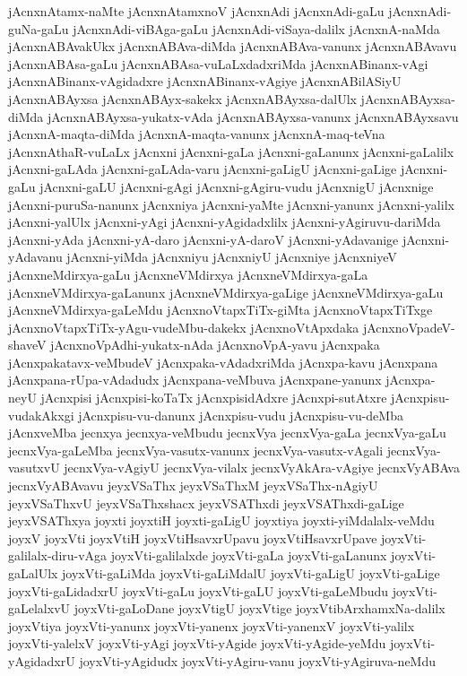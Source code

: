 {jAcnxnAtamx-naMte
jAcnxnAtamxnoV
jAcnxnAdi
jAcnxnAdi-gaLu
jAcnxnAdi-guNa-gaLu
jAcnxnAdi-viBAga-gaLu
jAcnxnAdi-viSaya-dalilx
jAcnxnA-naMda
jAcnxnABAvakUkx
jAcnxnABAva-diMda
jAcnxnABAva-vanunx
jAcnxnABAvavu
jAcnxnABAsa-gaLu
jAcnxnABAsa-vuLaLxdadxriMda
jAcnxnABinanx-vAgi
jAcnxnABinanx-vAgidadxre
jAcnxnABinanx-vAgiye
jAcnxnABilASiyU
jAcnxnABAyxsa
jAcnxnABAyx-sakekx
jAcnxnABAyxsa-dalUlx
jAcnxnABAyxsa-diMda
jAcnxnABAyxsa-yukatx-vAda
jAcnxnABAyxsa-vanunx
jAcnxnABAyxsavu
jAcnxnA-maqta-diMda
jAcnxnA-maqta-vanunx
jAcnxnA-maq-teVna
jAcnxnAthaR-vuLaLx
jAcnxni
jAcnxni-gaLa
jAcnxni-gaLanunx
jAcnxni-gaLalilx
jAcnxni-gaLAda
jAcnxni-gaLAda-varu
jAcnxni-gaLigU
jAcnxni-gaLige
jAcnxni-gaLu
jAcnxni-gaLU
jAcnxni-gAgi
jAcnxni-gAgiru-vudu
jAcnxnigU
jAcnxnige
jAcnxni-puruSa-nanunx
jAcnxniya
jAcnxni-yaMte
jAcnxni-yanunx
jAcnxni-yalilx
jAcnxni-yalUlx
jAcnxni-yAgi
jAcnxni-yAgidadxlilx
jAcnxni-yAgiruvu-dariMda
jAcnxni-yAda
jAcnxni-yA-daro
jAcnxni-yA-daroV
jAcnxni-yAdavanige
jAcnxni-yAdavanu
jAcnxni-yiMda
jAcnxniyu
jAcnxniyU
jAcnxniye
jAcnxniyeV
jAcnxneMdirxya-gaLu
jAcnxneVMdirxya
jAcnxneVMdirxya-gaLa
jAcnxneVMdirxya-gaLanunx
jAcnxneVMdirxya-gaLige
jAcnxneVMdirxya-gaLu
jAcnxneVMdirxya-gaLeMdu
jAcnxnoVtapxTiTx-giMta
jAcnxnoVtapxTiTxge
jAcnxnoVtapxTiTx-yAgu-vudeMbu-dakekx
jAcnxnoVtApxdaka
jAcnxnoVpadeV-shaveV
jAcnxnoVpAdhi-yukatx-nAda
jAcnxnoVpA-yavu
jAcnxpaka
jAcnxpakatavx-veMbudeV
jAcnxpaka-vAdadxriMda
jAcnxpa-kavu
jAcnxpana
jAcnxpana-rUpa-vAdadudx
jAcnxpana-veMbuva
jAcnxpane-yanunx
jAcnxpa-neyU
jAcnxpisi
jAcnxpisi-koTaTx
jAcnxpisidAdxre
jAcnxpi-sutAtxre
jAcnxpisu-vudakAkxgi
jAcnxpisu-vu-danunx
jAcnxpisu-vudu
jAcnxpisu-vu-deMba
jAcnxveMba
jecnxya
jecnxya-veMbudu
jecnxVya
jecnxVya-gaLa
jecnxVya-gaLu
jecnxVya-gaLeMba
jecnxVya-vasutx-vanunx
jecnxVya-vasutx-vAgali
jecnxVya-vasutxvU
jecnxVya-vAgiyU
jecnxVya-vilalx
jecnxVyAkAra-vAgiye
jecnxVyABAva
jecnxVyABAvavu
jeyxVSaThx
jeyxVSaThxM
jeyxVSaThx-nAgiyU
jeyxVSaThxvU
jeyxVSaThxshacx
jeyxVSAThxdi
jeyxVSAThxdi-gaLige
jeyxVSAThxya
joyxti
joyxtiH
joyxti-gaLigU
joyxtiya
joyxti-yiMdalalx-veMdu
joyxV
joyxVti
joyxVtiH
joyxVtiHsavxrUpavu
joyxVtiHsavxrUpave
joyxVti-galilalx-diru-vAga
joyxVti-galilalxde
joyxVti-gaLa
joyxVti-gaLanunx
joyxVti-gaLalUlx
joyxVti-gaLiMda
joyxVti-gaLiMdalU
joyxVti-gaLigU
joyxVti-gaLige
joyxVti-gaLidadxrU
joyxVti-gaLu
joyxVti-gaLU
joyxVti-gaLeMbudu
joyxVti-gaLelalxvU
joyxVti-gaLoDane
joyxVtigU
joyxVtige
joyxVtibArxhamxNa-dalilx
joyxVtiya
joyxVti-yanunx
joyxVti-yanenx
joyxVti-yanenxV
joyxVti-yalilx
joyxVti-yalelxV
joyxVti-yAgi
joyxVti-yAgide
joyxVti-yAgide-yeMdu
joyxVti-yAgidadxrU
joyxVti-yAgidudx
joyxVti-yAgiru-vanu
joyxVti-yAgiruva-neMdu
}
